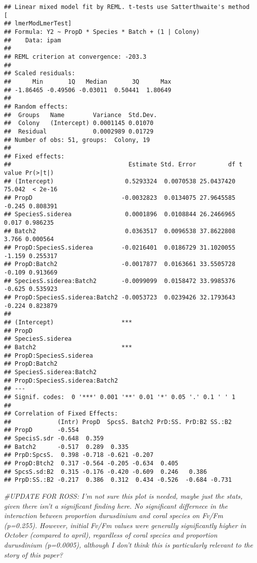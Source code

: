 \documentclass[]{article}
\newenvironment{Shaded}{\begin{snugshade}}{\end{snugshade}}
\newcommand{\CommentTok}[1]{\textcolor[rgb]{0.56,0.35,0.01}{\textit{#1}}}
\begin{document}
\begin{verbatim}
## Linear mixed model fit by REML. t-tests use Satterthwaite's method [
## lmerModLmerTest]
## Formula: Y2 ~ PropD * Species * Batch + (1 | Colony)
##    Data: ipam
## 
## REML criterion at convergence: -203.3
## 
## Scaled residuals: 
##      Min       1Q   Median       3Q      Max 
## -1.86465 -0.49506 -0.03011  0.50441  1.80649 
## 
## Random effects:
##  Groups   Name        Variance  Std.Dev.
##  Colony   (Intercept) 0.0001145 0.01070 
##  Residual             0.0002989 0.01729 
## Number of obs: 51, groups:  Colony, 19
## 
## Fixed effects:
##                                 Estimate Std. Error         df t value Pr(>|t|)
## (Intercept)                    0.5293324  0.0070538 25.0437420  75.042  < 2e-16
## PropD                         -0.0032823  0.0134075 27.9645585  -0.245 0.808391
## SpeciesS.siderea               0.0001896  0.0108844 26.2466965   0.017 0.986235
## Batch2                         0.0363517  0.0096538 37.8622808   3.766 0.000564
## PropD:SpeciesS.siderea        -0.0216401  0.0186729 31.1020055  -1.159 0.255317
## PropD:Batch2                  -0.0017877  0.0163661 33.5505728  -0.109 0.913669
## SpeciesS.siderea:Batch2       -0.0099099  0.0158472 33.9985376  -0.625 0.535923
## PropD:SpeciesS.siderea:Batch2 -0.0053723  0.0239426 32.1793643  -0.224 0.823879
##                                  
## (Intercept)                   ***
## PropD                            
## SpeciesS.siderea                 
## Batch2                        ***
## PropD:SpeciesS.siderea           
## PropD:Batch2                     
## SpeciesS.siderea:Batch2          
## PropD:SpeciesS.siderea:Batch2    
## ---
## Signif. codes:  0 '***' 0.001 '**' 0.01 '*' 0.05 '.' 0.1 ' ' 1
## 
## Correlation of Fixed Effects:
##             (Intr) PropD  SpcsS. Batch2 PrD:SS. PrD:B2 SS.:B2
## PropD       -0.554                                           
## SpecisS.sdr -0.648  0.359                                    
## Batch2      -0.517  0.289  0.335                             
## PrpD:SpcsS.  0.398 -0.718 -0.621 -0.207                      
## PropD:Btch2  0.317 -0.564 -0.205 -0.634  0.405               
## SpcsS.sd:B2  0.315 -0.176 -0.420 -0.609  0.246   0.386       
## PrpD:SS.:B2 -0.217  0.386  0.312  0.434 -0.526  -0.684 -0.731
\end{verbatim}

\begin{Shaded}
\begin{Highlighting}[]
\CommentTok{#UPDATE FOR ROSS: I'm not sure this plot is needed, maybe just the stats, given there isn't a significant finding here. No significant differnece in the interaction between proportion durusdinium and coral species on Fv/Fm (p=0.255). However, initial Fv/Fm values were generally significantly higher in October (compared to april), regardless of coral species and proportion durusdinium (p=0.0005), although I don't think this is particularly relevant to the story of this paper?}
\end{Highlighting}
\end{Shaded}
\end{document}
